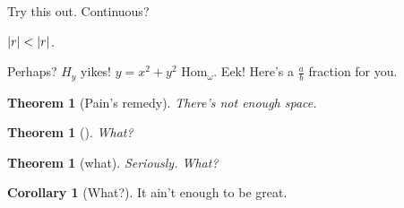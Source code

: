 \documentclass{amsart}
\newtheorem{thm}[equation]{Theorem}
\theoremstyle{definition}
\newtheorem{coro}[equation]{Corollary}
\renewcommand{\abs}[1]{\qty| #1 |}
\begin{document}
Try this out. Continuous?

\newcommand{\Hom}{\mathrm{Hom}}

$\abs r < \abs{r}$.

Perhaps? $H_{y}$ yikes! $y = x^2 + y^2$ $\Hom_{\omega}$. Eek! Here's a $\frac{a}{b}$ fraction for you.

\begin{thm}[Pain's remedy]
    There's not enough space.
\end{thm}

\begin{thm}[]
    What?
\end{thm}

\begin{thm}[what]
    Seriously. What?
\end{thm}

\begin{coro}[What?]
    It ain't enough to be great.
\end{coro}
\end{document}
